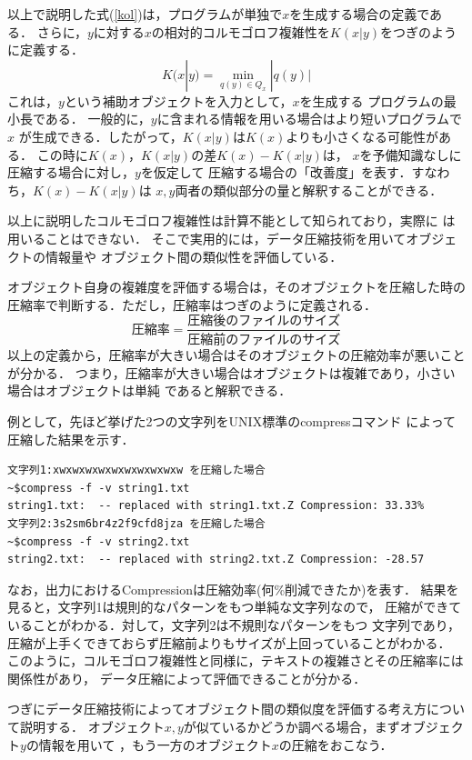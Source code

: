 以上で説明した式(\ref{kol})は，プログラムが単独で$x$を生成する場合の定義である．
さらに，$y$に対する$x$の相対的コルモゴロフ複雑性を$K(x|y)$をつぎのように定義する．
\begin{equation}
K(x|y) = \min_{q(y) \in Q_x} |q(y)| \label{kol2}
\end{equation}
これは，$y$という補助オブジェクトを入力として，$x$を生成する
プログラムの最小長である．
一般的に，$y$に含まれる情報を用いる場合はより短いプログラムで$x$
が生成できる．したがって，$K(x|y)$は$K(x)$よりも小さくなる可能性がある．
この時に$K(x)$，$K(x|y)$の差$K(x)-K(x|y)$は，
$x$を予備知識なしに圧縮する場合に対し，$y$を仮定して
圧縮する場合の「改善度」を表す．すなわち，$K(x)-K(x|y)$は
$x,y$両者の類似部分の量と解釈することができる．

以上に説明したコルモゴロフ複雑性は計算不能として知られており，実際に
は用いることはできない．
そこで実用的には，データ圧縮技術を用いてオブジェクトの情報量や
オブジェクト間の類似性を評価している．

オブジェクト自身の複雑度を評価する場合は，そのオブジェクトを圧縮した時の
圧縮率で判断する．ただし，圧縮率はつぎのように定義される．
\begin{equation}
圧縮率 = \frac{圧縮後のファイルのサイズ}{圧縮前のファイルのサイズ}
\end{equation}
以上の定義から，圧縮率が大きい場合はそのオブジェクトの圧縮効率が悪いことが分かる．
つまり，圧縮率が大きい場合はオブジェクトは複雑であり，小さい場合はオブジェクトは単純
であると解釈できる．

例として，先ほど挙げた2つの文字列をUNIX標準のcompressコマンド
によって圧縮した結果を示す．

\begin{verbatim}
文字列1:xwxwxwxwxwxwxwxwxwxw を圧縮した場合
~$compress -f -v string1.txt
string1.txt:  -- replaced with string1.txt.Z Compression: 33.33%
文字列2:3s2sm6br4z2f9cfd8jza を圧縮した場合
~$compress -f -v string2.txt
string2.txt:  -- replaced with string2.txt.Z Compression: -28.57
\end{verbatim}
なお，出力におけるCompressionは圧縮効率(何\%削減できたか)を表す．
結果を見ると，文字列1は規則的なパターンをもつ単純な文字列なので，
圧縮ができていることがわかる．対して，文字列2は不規則なパターンをもつ
文字列であり，圧縮が上手くできておらず圧縮前よりもサイズが上回っていることがわかる．
このように，コルモゴロフ複雑性と同様に，テキストの複雑さとその圧縮率には関係性があり，
データ圧縮によって評価できることが分かる．

つぎにデータ圧縮技術によってオブジェクト間の類似度を評価する考え方について説明する．
オブジェクト$x,y$が似ているかどうか調べる場合，まずオブジェクト$y$の情報を用いて
，もう一方のオブジェクト$x$の圧縮をおこなう．

